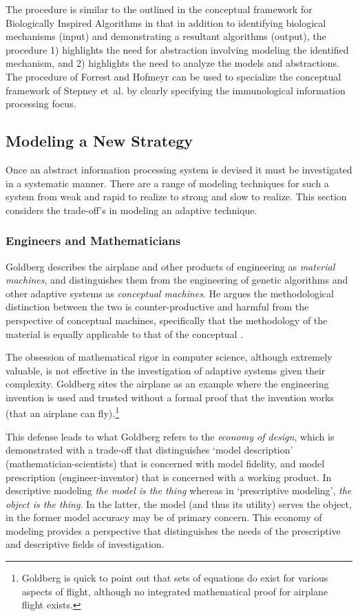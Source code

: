 The procedure is similar to the outlined in the conceptual framework for Biologically Inspired Algorithms in that in addition to identifying biological mechanisms (input) and demonstrating a resultant algorithms (output), the procedure 1) highlights the need for abstraction involving modeling the identified mechanism, and 2) highlights the need to analyze the models and abstractions. The procedure of Forrest and Hofmeyr can be used to specialize the conceptual framework of Stepney et~al. by clearly specifying the immunological information processing focus.


%
%
\subsection{Modeling a New Strategy}
\label{sub:engineers}
Once an abstract information processing system is devised it must be investigated in a systematic manner. There are a range of modeling techniques for such a system from weak and rapid to realize to strong and slow to realize. This section considers the trade-off's in modeling an adaptive technique.

\subsubsection{Engineers and Mathematicians}
Goldberg describes the airplane and other products of engineering as \emph{material machines}, and distinguishes them from the engineering of genetic algorithms and other adaptive systems as \emph{conceptual machines}. He argues the methodological distinction between the two is counter-productive and harmful from the perspective of conceptual machines, specifically that the methodology of the material is equally applicable to that of the conceptual \cite{Goldberg1999a}. 

The obsession of mathematical rigor in computer science, although extremely valuable, is not effective in the investigation of adaptive systems given their complexity. Goldberg sites the airplane as an example where the engineering invention is used and trusted without a formal proof that the invention works (that an airplane can fly).\footnote{Goldberg is quick to point out that sets of equations do exist for various aspects of flight, although no integrated mathematical proof for airplane flight exists.} 

This defense leads to what Goldberg refers to the \emph{economy of design}, which is demonstrated with a trade-off that distinguishes `model description' (mathematician-scientists) that is concerned with model fidelity, and model prescription (engineer-inventor) that is concerned with a working product. In descriptive modeling \emph{the model is the thing} whereas in `prescriptive modeling', \emph{the object is the thing}. In the latter, the model (and thus its utility) serves the object, in the former model accuracy may be of primary concern. This economy of modeling provides a perspective that distinguishes the needs of the prescriptive and descriptive fields of investigation. 

